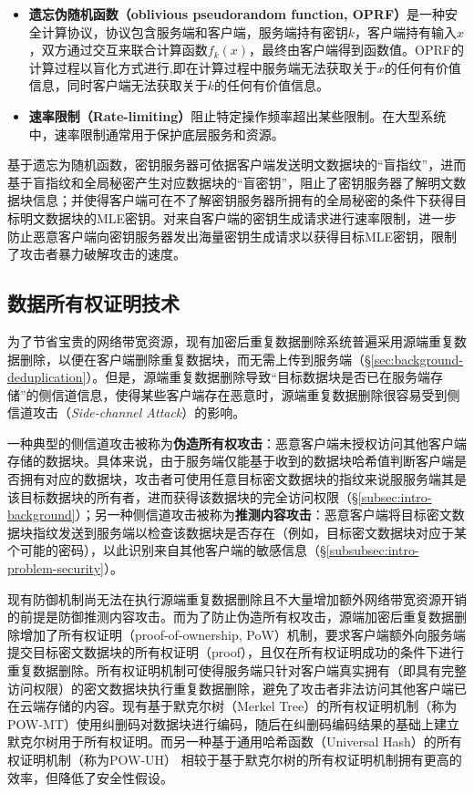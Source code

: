 \begin{itemize}[leftmargin=*]
    \item \textbf{遗忘伪随机函数（oblivious pseudorandom function, OPRF）}\cite{naor2004Number}是一种安全计算协议，协议包含服务端和客户端，服务端持有密钥$k$，客户端持有输入$x$，双方通过交互来联合计算函数$f_k(x)$，最终由客户端得到函数值。OPRF的计算过程以盲化方式进行,即在计算过程中服务端无法获取关于$x$的任何有价值信息，同时客户端无法获取关于$k$的任何有价值信息。
    \item \textbf{速率限制（Rate-limiting）}\cite{bellare2013DupLESS}阻止特定操作频率超出某些限制。在大型系统中，速率限制通常用于保护底层服务和资源。
\end{itemize}

基于遗忘为随机函数，密钥服务器可依据客户端发送明文数据块的“盲指纹”，进而基于盲指纹和全局秘密产生对应数据块的“盲密钥”，阻止了密钥服务器了解明文数据块信息；并使得客户端可在不了解密钥服务器所拥有的全局秘密的条件下获得目标明文数据块的MLE密钥。对来自客户端的密钥生成请求进行速率限制，进一步防止恶意客户端向密钥服务器发出海量密钥生成请求以获得目标MLE密钥，限制了攻击者暴力破解攻击的速度。

\subsection{数据所有权证明技术}
\label{subsec:background-encrypted-deduplication-pow}

为了节省宝贵的网络带宽资源，现有加密后重复数据删除系统普遍采用源端重复数据删除，以便在客户端删除重复数据块，而无需上传到服务端（\S\ref{sec:background-deduplication}）。但是，源端重复数据删除导致“目标数据块是否已在服务端存储”的侧信道信息，使得某些客户端存在恶意时，源端重复数据删除很容易受到侧信道攻击（\textit{Side-channel Attack}）\cite{harnik2010side,halevi11}的影响。

一种典型的侧信道攻击被称为\textbf{伪造所有权攻击}：恶意客户端未授权访问其他客户端存储的数据块\cite{harnik2010side,mulazzani11}。具体来说，由于服务端仅能基于收到的数据块哈希值判断客户端是否拥有对应的数据块，攻击者可使用任意目标密文数据块的指纹来说服服务端其是该目标数据块的所有者，进而获得该数据块的完全访问权限（\S\ref{subsec:intro-background}）；另一种侧信道攻击被称为\textbf{推测内容攻击}：恶意客户端将目标密文数据块指纹发送到服务端以检查该数据块是否存在（例如，目标密文数据块对应于某个可能的密码\cite{harnik2010side}），以此识别来自其他客户端的敏感信息（\S\ref{subsubsec:intro-problem-security}）。

现有防御机制尚无法在执行源端重复数据删除且不大量增加额外网络带宽资源开销的前提是防御推测内容攻击。而为了防止伪造所有权攻击，源端加密后重复数据删除增加了所有权证明（proof-of-ownership, PoW）机制\cite{halevi11}，要求客户端额外向服务端提交目标密文数据块的所有权证明（proof），且仅在所有权证明成功的条件下进行重复数据删除。所有权证明机制可使得服务端只针对客户端真实拥有（即具有完整访问权限）的密文数据块执行重复数据删除，避免了攻击者非法访问其他客户端已在云端存储的内容。现有基于默克尔树（Merkel Tree）的所有权证明机制（称为POW-MT）\cite{xu2013weak}使用纠删码对数据块进行编码，随后在纠删码编码结果的基础上建立默克尔树用于所有权证明。而另一种基于通用哈希函数（Universal Hash）的所有权证明机制（称为POW-UH）\cite{halevi2011proofs} 相较于基于默克尔树的所有权证明机制拥有更高的效率，但降低了安全性假设。


